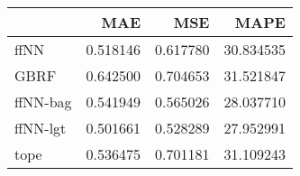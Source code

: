 \begin{tabular}{lrrr}
\toprule
{} &       MAE &       MSE &       MAPE \\
\midrule
ffNN     &  0.518146 &  0.617780 &  30.834535 \\
GBRF     &  0.642500 &  0.704653 &  31.521847 \\
ffNN-bag &  0.541949 &  0.565026 &  28.037710 \\
ffNN-lgt &  0.501661 &  0.528289 &  27.952991 \\
tope     &  0.536475 &  0.701181 &  31.109243 \\
\bottomrule
\end{tabular}
